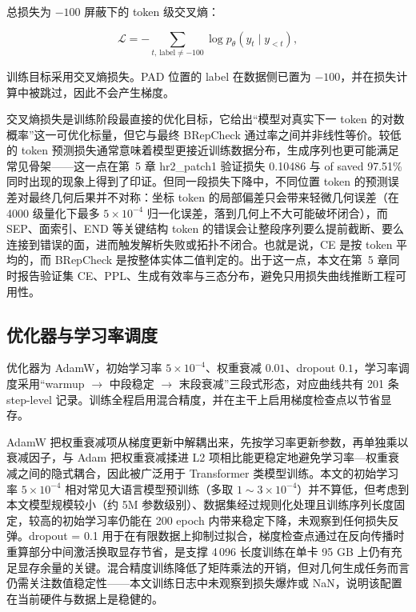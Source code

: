 总损失为 $-100$ 屏蔽下的 token 级交叉熵：

\begin{equation}
    \mathcal{L} = -\sum_{t,\, \text{label} \ne -100} \log p_{\theta}(y_t \mid y_{<t}),
    \label{eq:ce-loss}
\end{equation}

训练目标采用交叉熵损失。PAD 位置的 label 在数据侧已置为 $-100$，并在损失计算中被跳过，因此不会产生梯度。

交叉熵损失是训练阶段最直接的优化目标，它给出“模型对真实下一 token 的对数概率”这一可优化标量，但它与最终 BRepCheck 通过率之间并非线性等价。较低的 token 预测损失通常意味着模型更接近训练数据分布，生成序列也更可能满足常见骨架——这一点在第~5 章 hr2\_patch1 验证损失 0.10486 与 of saved 97.51\% 同时出现的现象上得到了印证。但同一段损失下降中，不同位置 token 的预测误差对最终几何后果并不对称：坐标 token 的局部偏差只会带来轻微几何误差（在 4000 级量化下最多 $5 \times 10^{-4}$ 归一化误差，落到几何上不大可能破坏闭合），而 SEP、面索引、END 等关键结构 token 的错误会让整段序列要么提前截断、要么连接到错误的面，进而触发解析失败或拓扑不闭合。也就是说，CE 是按 token 平均的，而 BRepCheck 是按整体实体二值判定的。出于这一点，本文在第~5 章同时报告验证集 CE、PPL、生成有效率与三态分布，避免只用损失曲线推断工程可用性。

\subsection{优化器与学习率调度}

优化器为 AdamW\cite{kingma_2015_adam,loshchilov_2019_adamw}，初始学习率 $5 \times 10^{-4}$、权重衰减 $0.01$、dropout $0.1$，学习率调度采用“warmup $\to$ 中段稳定 $\to$ 末段衰减”三段式形态，对应曲线共有 201 条 step-level 记录。训练全程启用混合精度\cite{micikevicius_2018_mixed_precision}，并在主干上启用梯度检查点以节省显存。

AdamW 把权重衰减项从梯度更新中解耦出来，先按学习率更新参数，再单独乘以衰减因子，与 Adam 把权重衰减揉进 L2 项相比能更稳定地避免学习率—权重衰减之间的隐式耦合，因此被广泛用于 Transformer 类模型训练。本文的初始学习率 $5 \times 10^{-4}$ 相对常见大语言模型预训练（多取 $1 \sim 3 \times 10^{-4}$）并不算低，但考虑到本文模型规模较小（约 5M 参数级别）、数据集经过规则化处理且训练序列长度固定，较高的初始学习率仍能在 200 epoch 内带来稳定下降，未观察到任何损失反弹。dropout = 0.1 用于在有限数据上抑制过拟合，梯度检查点通过在反向传播时重算部分中间激活换取显存节省，是支撑 4\,096 长度训练在单卡 95 GB 上仍有充足显存余量的关键。混合精度训练降低了矩阵乘法的开销，但对几何生成任务而言仍需关注数值稳定性——本文训练日志中未观察到损失爆炸或 NaN，说明该配置在当前硬件与数据上是稳健的。

